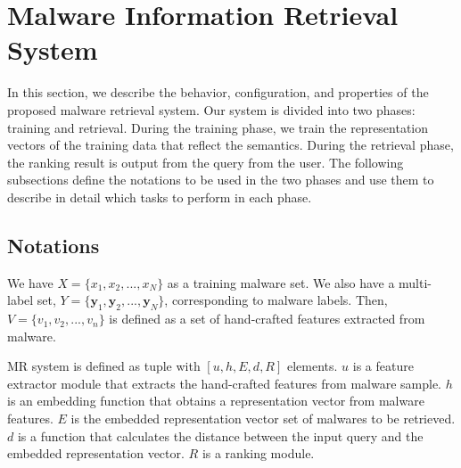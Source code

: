 \section{Malware Information Retrieval System}
In this section, we describe the behavior, configuration, and properties of the proposed malware retrieval system. Our system is divided into two phases: training and retrieval. During the training phase, we train the representation vectors of the training data that reflect the semantics. During the retrieval phase, the ranking result is output from the query from the user. The following subsections define the notations to be used in the two phases and use them to describe in detail which tasks to perform in each phase.

\subsection{Notations}
We have $X = \{x_1, x_2, ..., x_N\}$ as a training malware set. We also have a multi-label set, $Y = \{\mathbf{y}_{1}, \mathbf{y}_{2}, ... , \mathbf{y}_{N}\}$, corresponding to malware labels. Then, $V = \{v_1, v_2, ..., v_n \}$ is defined as a set of hand-crafted features extracted from malware.

MR system is defined as tuple with $[u, h, E, d, R]$ elements. $u$ is a feature extractor module that extracts the hand-crafted features from malware sample. $h$ is an embedding function that obtains a representation vector from malware features. $E$ is the embedded representation vector set of malwares to be retrieved. $d$ is a function that calculates the distance between the input query and the embedded representation vector. $R$ is a ranking module. %



